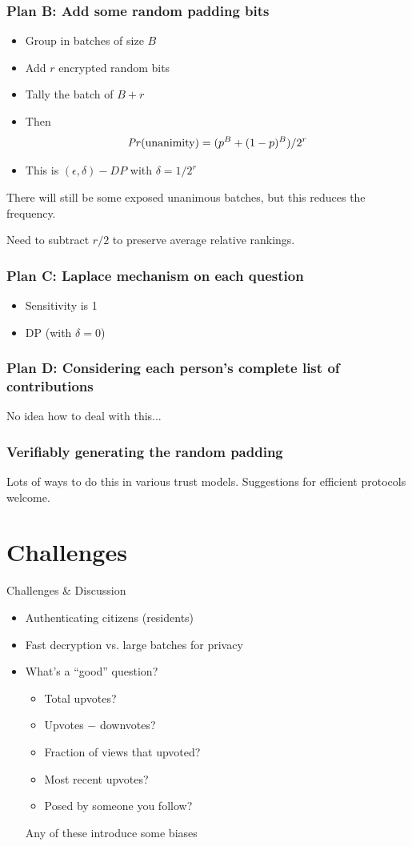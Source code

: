\documentclass[10pt,xcolor=svgnames,169]{beamer} %
\begin{document}
\begin{frame}
	\frametitle{Plan B: Add some random padding bits}
	\begin{itemize}
		\item 	Group in batches of size $B$
\item Add $r$ encrypted random bits
\item Tally the batch of $B+r$
	\item Then $$\mathit{Pr}(\text{unanimity}) = (p^B + (1-p)^B)/2^r$$
	\item This is $(\epsilon,\delta)-DP$ with $\delta = 1/2^r$
	\end{itemize}


There will still be some exposed unanimous batches, but this reduces the frequency.

Need to subtract $r/2$ to preserve average relative rankings.
\end{frame}

\begin{frame}
	\frametitle{Plan C: Laplace mechanism on each question}
	\begin{itemize}
		\item Sensitivity is 1
		\item DP (with $\delta = 0$)
	\end{itemize}
\end{frame}


\begin{frame}
	\frametitle{Plan D: Considering each person's complete list of contributions}
	No idea how to deal with this...
\end{frame}
			

\begin{frame}
	\frametitle{Verifiably generating the random padding}
	Lots of ways to do this in various trust models. Suggestions for efficient protocols welcome.
\end{frame}
			
	\section{Challenges}
	
	\begin{frame}{Challenges \& Discussion}
		\begin{itemize}
			\item Authenticating citizens (residents)
			\item Fast decryption vs. large batches for privacy
			\item What's a ``good'' question?
				\begin{itemize}
					\item Total upvotes?
					\item Upvotes $-$ downvotes?
					\item Fraction of views that upvoted?
					\item Most recent upvotes?
					\item Posed by someone you follow?
				\end{itemize}
			
			Any of these introduce some biases
		\end{itemize}
	\end{frame}
\end{document}
